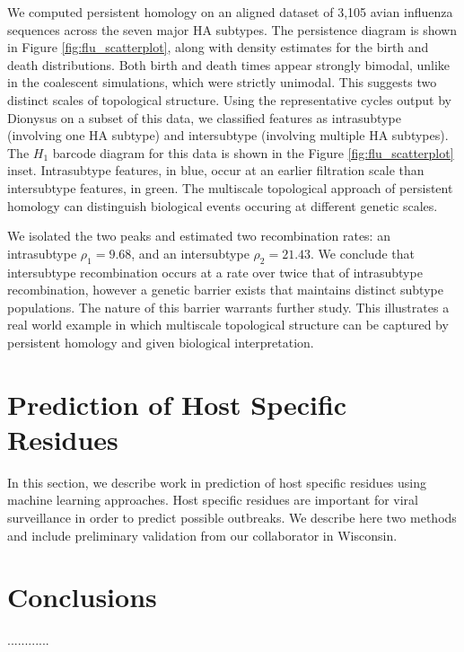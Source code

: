 We computed persistent homology on an aligned dataset of 3,105 avian influenza sequences across the seven major HA subtypes.
The persistence diagram is shown in Figure \ref{fig:flu_scatterplot}, along with density estimates for the birth and death distributions.
Both birth and death times appear strongly bimodal, unlike in the coalescent simulations, which were strictly unimodal.
This suggests two distinct scales of topological structure.
Using the representative cycles output by Dionysus on a subset of this data, we classified features as intrasubtype (involving one HA subtype) and intersubtype (involving multiple HA subtypes).
The $H_1$ barcode diagram for this data is shown in the Figure \ref{fig:flu_scatterplot} inset.
Intrasubtype features, in blue, occur at an earlier filtration scale than intersubtype features, in green.
The multiscale topological approach of persistent homology can distinguish biological events occuring at different genetic scales.

We isolated the two peaks and estimated two recombination rates: an intrasubtype $\rho_{1}=9.68$, and an intersubtype $\rho_{2}=21.43$.
We conclude that intersubtype recombination occurs at a rate over twice that of intrasubtype recombination, however a genetic barrier exists that maintains distinct subtype populations.
The nature of this barrier warrants further study.
This illustrates a real world example in which multiscale topological structure can be captured by persistent homology and given biological interpretation.

\section{Prediction of Host Specific Residues}
\label{sec:flu_flumarker}

In this section, we describe work in prediction of host specific residues using machine learning approaches.
Host specific residues are important for viral surveillance in order to predict possible outbreaks.
We describe here two methods and include preliminary validation from our collaborator in Wisconsin.

\section{Conclusions}
\label{sec:flu_conclusions}

............